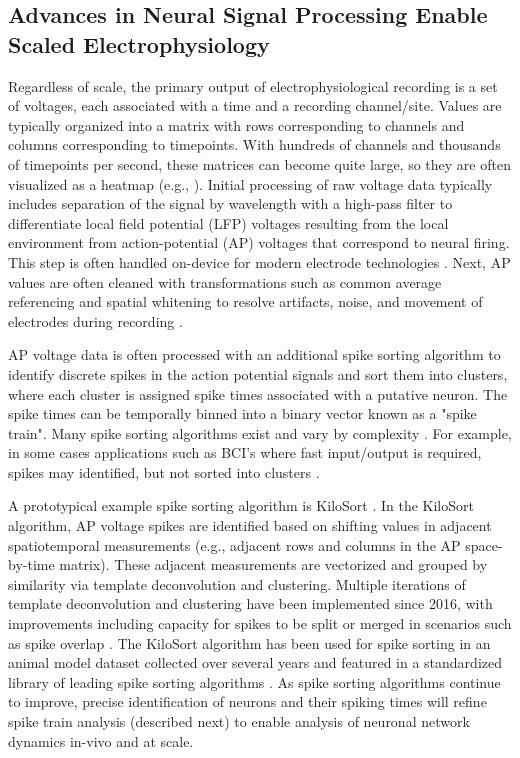\documentclass[11pt]{article}
\newcommand{\subsectionwithindent}[1]{
    \subsection*{#1}
    \hspace{\parindent} %
}
\begin{document}
\subsectionwithindent{Advances in Neural Signal Processing Enable Scaled Electrophysiology}
Regardless of scale, the primary output of electrophysiological recording is a set of voltages, each associated with a time and a recording channel/site. Values are typically organized into a matrix with rows corresponding to channels and columns corresponding to timepoints. With hundreds of channels and thousands of timepoints per second, these matrices can become quite large, so they are often visualized as a heatmap (e.g., \cite[Fig.~1A]{pachitariu2016kilosort}). Initial processing of raw voltage data typically includes separation of the signal by wavelength with a high-pass filter to differentiate local field potential (LFP) voltages resulting from the local environment from action-potential (AP) voltages that correspond to neural firing. This step is often handled on-device for modern electrode technologies \cite{jun2017probes}. Next, AP values are often cleaned with transformations such as common average referencing and spatial whitening to resolve artifacts, noise, and movement of electrodes during recording \cite{pachitariu2016kilosort, pachitariu2024kilosort4}.

AP voltage data is often processed with an additional spike sorting algorithm to identify discrete spikes in the action potential signals and sort them into clusters, where each cluster is assigned spike times associated with a putative neuron. The spike times can be temporally binned into a binary vector known as a "spike train". Many spike sorting algorithms exist and vary by complexity \cite{jog2002tetrode, pachitariu2016kilosort, boussard2023dartsort}. For example, in some cases applications such as BCI's where fast input/output is required, spikes may identified, but not sorted into clusters \cite{musk2019integrated, todorova2014sorting, christie2015sorting, trautmann2019accurate}.

A prototypical example spike sorting algorithm is KiloSort \cite{pachitariu2016kilosort, pachitariu2024kilosort4}. In the KiloSort algorithm, AP voltage spikes are identified based on shifting values in adjacent spatiotemporal measurements (e.g., adjacent rows and columns in the AP space-by-time matrix). These adjacent measurements are vectorized and grouped by similarity via template deconvolution and clustering. Multiple iterations of template deconvolution and clustering have been implemented since 2016, with improvements including capacity for spikes to be split or merged in scenarios such as spike overlap \cite{pachitariu2016kilosort,pachitariu2024kilosort4}. The KiloSort algorithm has been used for spike sorting in an animal model dataset collected over several years \cite{ibl2022datarelease, ibl2022iblsorter} and featured in a standardized library of leading spike sorting algorithms \cite{buccino2020spikeinterface}. As spike sorting algorithms continue to improve, precise identification of neurons and their spiking times will refine spike train analysis (described next) to enable analysis of neuronal network dynamics in-vivo and at scale.
\end{document}
